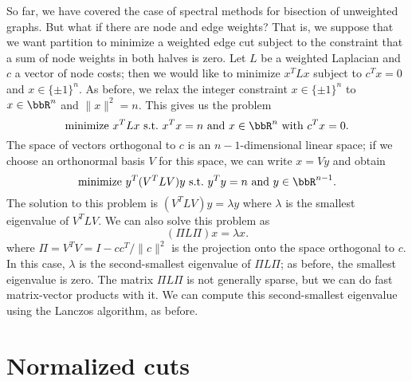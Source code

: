 \documentclass[12pt, leqno]{article} %
\begin{document}
So far, we have covered the case of spectral methods for bisection of
unweighted graphs.  But what if there are node and edge weights?  That
is, we suppose that we want partition to minimize a weighted edge cut
subject to the constraint that a sum of node weights in both halves is
zero.  Let $L$ be a weighted Laplacian and $c$ a vector of node costs;
then we would like to minimize $x^T L x$ subject to $c^T x = 0$ and
$x \in \{ \pm 1 \}^n$.  As before, we relax the integer constraint
$x \in \{ \pm 1 \}^n$ to $x \in \bbR^n$ and $\|x\|^2 = n$.  This gives
us the problem
\[
  \mbox{minimize } x^T L x \mbox{ s.t.~} x^T x = n \mbox{ and } x \in
  \bbR^n \mbox{ with } c^T x = 0.
\]
The space of vectors orthogonal to $c$ is an $n-1$-dimensional linear
space; if we choose an orthonormal basis $V$ for this space, we
can write $x = Vy$ and obtain
\[
  \mbox{minimize } y^T (V^T L V) y
  \mbox{ s.t.~} y^T y = n
  \mbox{ and } y \in \bbR^{n-1}.
\]
The solution to this problem is $(V^T L V)y = \lambda y$ where
$\lambda$ is the smallest eigenvalue of $V^T L V$.  We can also
solve this problem as
\[
  (\Pi L \Pi) x = \lambda x.
\]
where $\Pi = V^T V = I-cc^T/\|c\|^2$ is the projection onto the
space orthogonal to $c$.  In this case, $\lambda$ is the
second-smallest eigenvalue of $\Pi L \Pi$; as before, the smallest
eigenvalue is zero.  The matrix $\Pi L \Pi$ is not generally sparse,
but we can do fast matrix-vector products with it.
We can compute this second-smallest eigenvalue
using the Lanczos algorithm, as before.

\section{Normalized cuts}
\end{document}
